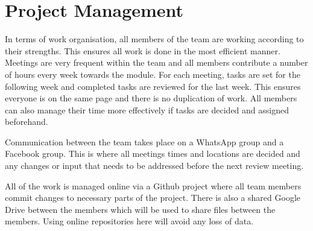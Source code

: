 \section{Project Management}

In terms of work organisation, all members of the team are working according to their strengths. This ensures all work is done in the most efficient manner. Meetings are very frequent within the team and all members contribute a number of hours every week towards the module. For each meeting, tasks are set for the following week and completed tasks are reviewed for the last week. This ensures everyone is on the same page and there is no duplication of work. All members can also manage their time more effectively if tasks are decided and assigned beforehand.

Communication between the team takes place on a WhatsApp group and a Facebook group. This is where all meetings times and locations are decided and any changes or input that needs to be addressed before the next review meeting. 

All of the work is managed online via a Github project where all team members commit changes to necessary parts of the project. There is also a shared Google Drive between the members which will be used to share files between the members. Using online repositories here will avoid any loss of data.